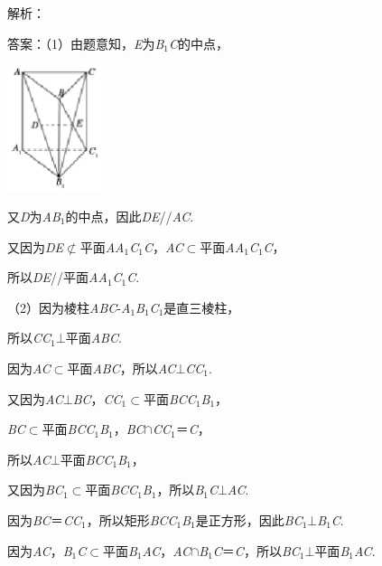 \documentclass{article} %
\begin{document}
解析：

答案：（1）由题意知，\textit{E}为\textit{B}${}_{1}$\textit{C}的中点，

\includegraphics*[width=1.10in, height=1.45in, keepaspectratio=false]{image246}

又\textit{D}为\textit{AB}${}_{1}$的中点，因此\textit{DE}//\textit{AC}.

又因为\textit{DE}$\mathrm{\nsubset}$平面\textit{AA}${}_{1}$\textit{C}${}_{1}$\textit{C}，\textit{AC}$\mathrm{\subset }$平面\textit{AA}${}_{1}$\textit{C}${}_{1}$\textit{C}，

所以\textit{DE}//平面\textit{AA}${}_{1}$\textit{C}${}_{1}$\textit{C}.

（2）因为棱柱\textit{ABC}-\textit{A}${}_{1}$\textit{B}${}_{1}$\textit{C}${}_{1}$是直三棱柱，

所以\textit{CC}${}_{1}$$\mathrm{\bot}$平面\textit{ABC}.

因为\textit{AC}$\mathrm{\subset }$平面\textit{ABC}，所以\textit{AC}$\mathrm{\bot}$\textit{CC}${}_{1}$.

又因为\textit{AC}$\mathrm{\bot}$\textit{BC}，\textit{CC}${}_{1}$$\mathrm{\subset }$平面\textit{BCC}${}_{1}$\textit{B}${}_{1}$，

\textit{BC}$\mathrm{\subset }$平面\textit{BCC}${}_{1}$\textit{B}${}_{1}$，\textit{BC}$\mathrm{\cap}$\textit{CC}${}_{1}$＝\textit{C}，

所以\textit{AC}$\mathrm{\bot}$平面\textit{BCC}${}_{1}$\textit{B}${}_{1}$，

又因为\textit{BC}${}_{1}$$\mathrm{\subset }$平面\textit{BCC}${}_{1}$\textit{B}${}_{1}$，所以\textit{B}${}_{1}$\textit{C}$\mathrm{\bot}$\textit{AC}.

因为\textit{BC}＝\textit{CC}${}_{1}$，所以矩形\textit{BCC}${}_{1}$\textit{B}${}_{1}$是正方形，因此\textit{BC}${}_{1}$$\mathrm{\bot}$\textit{B}${}_{1}$\textit{C}.

因为\textit{AC}，\textit{B}${}_{1}$\textit{C}$\mathrm{\subset }$平面\textit{B}${}_{1}$\textit{AC}，\textit{AC}$\mathrm{\cap}$\textit{B}${}_{1}$\textit{C}＝\textit{C}，所以\textit{BC}${}_{1}$$\mathrm{\bot}$平面\textit{B}${}_{1}$\textit{AC}.
\end{document}
